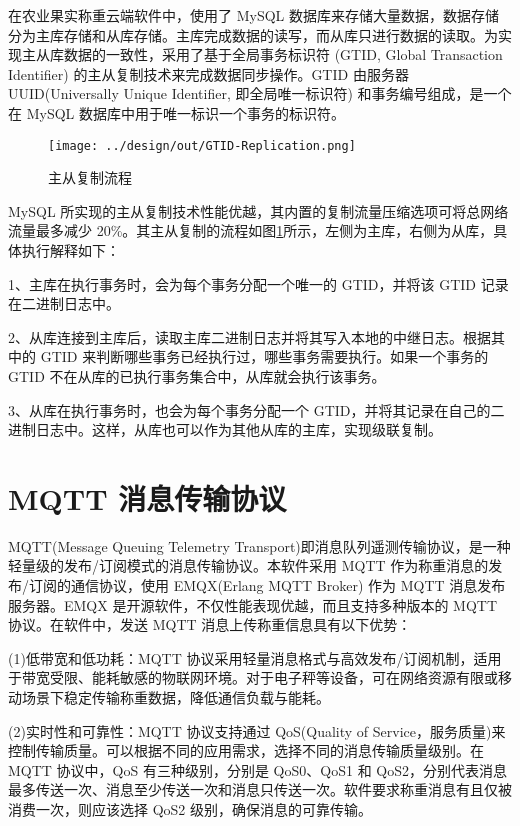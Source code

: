 在农业果实称重云端软件中，使用了 MySQL 数据库来存储大量数据，数据存储分为主库存储和从库存储。主库完成数据的读写，而从库只进行数据的读取。为实现主从库数据的一致性，采用了基于全局事务标识符 (GTID, Global Transaction Identifier) 的主从复制技术来完成数据同步操作。GTID 由服务器 UUID(Universally Unique Identifier, 即全局唯一标识符) 和事务编号组成，是一个在 MySQL 数据库中用于唯一标识一个事务的标识符。

\begin{figure}[H]
    \centering
    \texttt{[image: ../design/out/GTID-Replication.png]}
    \caption{主从复制流程}
    \label{fig:GTID-Replication}
\end{figure}

MySQL 所实现的主从复制技术性能优越，其内置的复制流量压缩选项可将总网络流量最多减少 20\%\cite{shehzad2020networkfootprintreplicationpopular}。其主从复制的流程如图\ref{fig:GTID-Replication}所示，左侧为主库，右侧为从库，具体执行解释如下：

1、主库在执行事务时，会为每个事务分配一个唯一的 GTID，并将该 GTID 记录在二进制日志中。

2、从库连接到主库后，读取主库二进制日志并将其写入本地的中继日志。根据其中的 GTID 来判断哪些事务已经执行过，哪些事务需要执行。如果一个事务的 GTID 不在从库的已执行事务集合中，从库就会执行该事务。

3、从库在执行事务时，也会为每个事务分配一个 GTID，并将其记录在自己的二进制日志中。这样，从库也可以作为其他从库的主库，实现级联复制\cite{MySQL-Liu2022}。

\section{MQTT 消息传输协议}\label{sec:mqtt}

MQTT(Message Queuing Telemetry Transport)即消息队列遥测传输协议，是一种轻量级的发布/订阅模式的消息传输协议。本软件采用 MQTT 作为称重消息的发布/订阅的通信协议，使用 EMQX(Erlang MQTT Broker) 作为 MQTT 消息发布服务器。EMQX 是开源软件，不仅性能表现优越，而且支持多种版本的 MQTT 协议\cite{dizdarevic2023engineeringexperimentallybenchmarkingopen}。在软件中，发送 MQTT 消息上传称重信息具有以下优势：

(1)低带宽和低功耗：MQTT 协议采用轻量消息格式与高效发布/订阅机制，适用于带宽受限、能耗敏感的物联网环境。对于电子秤等设备，可在网络资源有限或移动场景下稳定传输称重数据，降低通信负载与能耗\cite{Jia2015}。

(2)实时性和可靠性：MQTT 协议支持通过 QoS(Quality of Service，服务质量)来控制传输质量。可以根据不同的应用需求，选择不同的消息传输质量级别。在 MQTT 协议中，QoS 有三种级别\cite{Jia2015}，分别是 QoS0、QoS1 和 QoS2，分别代表消息最多传送一次、消息至少传送一次和消息只传送一次。软件要求称重消息有且仅被消费一次，则应该选择 QoS2 级别，确保消息的可靠传输。

